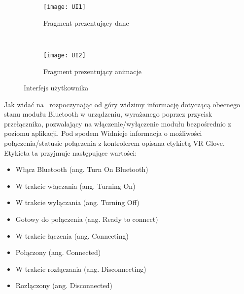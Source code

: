 \begin{figure}[h]
\centering
	\begin{subfigure}[b]{0.45\textwidth}
	\texttt{[image: UI1]}
	\caption{Fragment prezentujący dane}
	\label{fig:ifceDane}
	\end{subfigure}
	~
	\begin{subfigure}[b]{0.45\textwidth}
	\texttt{[image: UI2]}
	\caption{Fragment prezentujący animacje}
	\label{fig:ifceAnimacja}
	\end{subfigure}
\caption{Interfejs użytkownika}
\label{fig:ifce}
\end{figure}

Jak widać na~\cite{fig:ifceDane} rozpoczynając od góry widzimy informację dotyczącą obecnego stanu modułu Bluetooth w urządzeniu, wyrażanego poprzez przycisk przełącznika, pozwalający na włączenie/wyłączenie modułu bezpośrednio z poziomu aplikacji. Pod spodem Widnieje informacja o możliwości połączenia/statusie połączenia z kontrolerem opisana etykietą VR Glove. Etykieta ta przyjmuje następujące wartości:
\begin{itemize}
\item Włącz Bluetooth (ang. Turn On Bluetooth)
\item W trakcie włączania (ang. Turning On)
\item W trakcie wyłączania (ang. Turning Off)
\item Gotowy do połączenia (ang. Ready to connect)
\item W trakcie łączenia (ang. Connecting)
\item Połączony (ang. Connected)
\item W trakcie rozłączania (ang. Disconnecting)
\item Rozłączony (ang. Disconnected)
\end{itemize}
\label{itm:stany}
